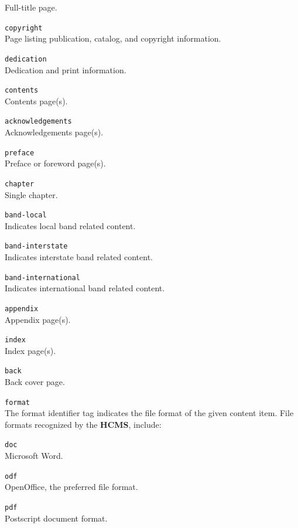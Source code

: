 \documentclass[12pt]{article}
\begin{document}
\begin{description}
\begin{description}
	Full-title page.
	\item {\tt copyright}\\
	Page listing publication, catalog, and copyright information.
	\item {\tt dedication}\\
	Dedication and print information.
	\item {\tt contents}\\
	Contents page(s).
	\item {\tt acknowledgements}\\
	Acknowledgements page(s).
	\item {\tt preface}\\
	Preface or foreword page(s).
	\item {\tt chapter}\\
	Single chapter.
	\item {\tt band-local}\\
	Indicates local band related content.
	\item {\tt band-interstate}\\
	Indicates interstate band related content.
	\item {\tt band-international}\\
	Indicates international band related content.
	\item {\tt appendix}\\
	Appendix page(s).
	\item {\tt index}\\
	Index page(s).
	\item {\tt back}\\
	Back cover page.
	\end{description}
\item{\tt format}\\
The format identifier tag indicates the file format of the given content item. File formats recognized by the {\bf \small HCMS}, include:
	\begin{description}
	\item {\tt doc}\\
	Microsoft Word.
	\item {\tt odf}\\
	OpenOffice, the preferred file format.
	\item {\tt pdf}\\
	Postscript document format.\\

\end{description}
\end{description}
\end{document}
